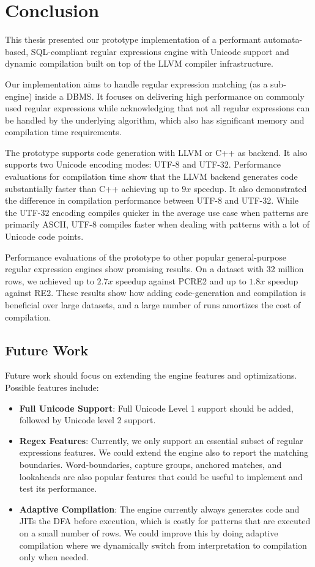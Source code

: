\chapter{Conclusion}\label{chapter:conclusion}
This thesis presented our prototype implementation of a performant automata-based, SQL-compliant regular expressions engine with Unicode support and dynamic compilation built on top of the LLVM compiler infrastructure.

Our implementation aims to handle regular expression matching (as a sub-engine) inside a DBMS. It focuses on delivering high performance on commonly used regular expressions while acknowledging that not all regular expressions can be handled by the underlying algorithm, which also has significant memory and compilation time requirements.

The prototype supports code generation with LLVM or C++ as backend. It also supports two Unicode encoding modes: UTF-8 and UTF-32. Performance evaluations for compilation time show that the LLVM backend generates code substantially faster than C++ achieving up to $9x$ speedup. It also demonstrated the difference in compilation performance between UTF-8 and UTF-32. While the UTF-32 encoding compiles quicker in the average use case when patterns are primarily ASCII, UTF-8 compiles faster when dealing with patterns with a lot of Unicode code points. 

Performance evaluations of the prototype to other popular general-purpose regular expression engines show promising results. On a dataset with 32 million rows, we achieved up to $2.7x$ speedup against PCRE2 and up to $1.8x$ speedup against RE2. These results show how adding code-generation and compilation is beneficial over large datasets, and a large number of runs amortizes the cost of compilation.

\section{Future Work}\label{futurework}

Future work should focus on extending the engine features and optimizations. Possible features include:
\begin{itemize}
    \item \textbf{Full Unicode Support}: Full Unicode Level 1 support should be added, followed by Unicode level 2 support.
    \item \textbf{Regex Features}: Currently, we only support an essential subset of regular expressions features. We could extend the engine also to report the matching boundaries. Word-boundaries, capture groups, anchored matches, and lookaheads are also popular features that could be useful to implement and test its performance.
    \item \textbf{Adaptive Compilation}: The engine currently always generates code and JITs the DFA before execution, which is costly for patterns that are executed on a small number of rows. We could improve this by doing adaptive compilation where we dynamically switch from interpretation to compilation only when needed.
\end{itemize}


